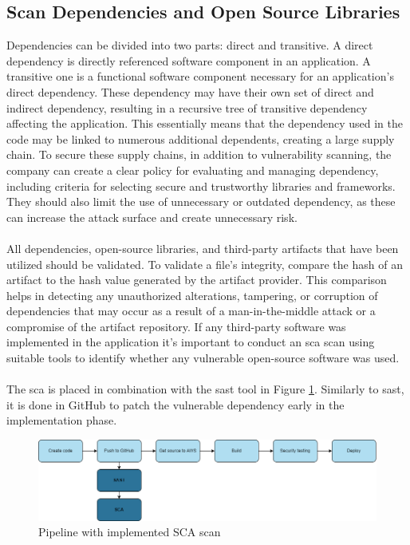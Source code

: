 \subsection{Scan Dependencies and Open Source Libraries}
\label{Scan Dependencies and Open Source Libraries}
Dependencies can be divided into two parts: direct and transitive. A direct dependency is directly referenced software component in an application. A transitive one is a functional software component necessary for an application's direct \gls{dependency}. These \gls{dependency} may have their own set of direct and indirect \gls{dependency}, resulting in a recursive tree of transitive \gls{dependency} affecting the application. This essentially means that the \gls{dependency} used in the code may be linked to numerous additional dependents, creating a large supply chain. To secure these supply chains, in addition to vulnerability scanning, the company can create a clear policy for evaluating and managing \gls{dependency}, including criteria for selecting secure and trustworthy libraries and frameworks. They should also limit the use of unnecessary or outdated \gls{dependency}, as these can increase the attack surface and create unnecessary risk. \cite{googledependency}
\\~\\
All dependencies, open-source libraries, and third-party \gls{artifact}s that have been utilized should be validated. To validate a file's integrity, compare the hash of an artifact to the hash value generated by the artifact provider. This comparison helps in detecting any unauthorized alterations, tampering, or corruption of dependencies that may occur as a result of a man-in-the-middle attack or a compromise of the artifact repository. If any third-party software was implemented in the application it's important to conduct an \acrshort{sca} scan using suitable tools to identify whether any vulnerable open-source software was used. \cite{bestpracticeSupplyChain}
\\~\\
The \acrshort{sca} is placed in combination with the \acrshort{sast} tool in Figure \ref{fig: Pipeline with implemented SCA scan}. Similarly to \acrshort{sast}, it is done in GitHub to patch the vulnerable \gls{dependency} early in the implementation phase.

\vspace{2mm}
\begin{figure}[H]
    \centering
    \includegraphics[width=0.8\columnwidth]{Images/pipeline3.png}
    \caption{Pipeline with implemented SCA scan}
    \label{fig: Pipeline with implemented SCA scan}
\end{figure}

